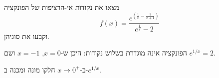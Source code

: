 
\begin{question}
מצאו את נקודות אי-הרציפות של הפונקציה
\[ f(x)=\frac{e^{\left(\frac1x-\frac{1}{x+1}\right)}}{e^{\frac1x}-2} \]
וקבעו את סוגיהן.
\end{question}

\begin{hint}
הפונקציה אינה מוגדרת בשלוש נקודות: היכן ש-$x=0$, $x=-1$ ושם $e^{1/x}=2$.
\end{hint}

\begin{hint}
ב-$x\to0^+$ חלקו מונה ומכנה ב-$e^{1/x}$.
\end{hint}

